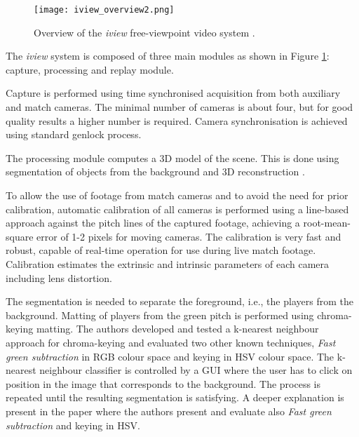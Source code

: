 
\begin{figure}[htbp]
\centerline{\texttt{[image: iview\_overview2.png]}}
\caption{Overview of the \textit{iview} free-viewpoint video system \cite{02_iview}.}
\label{fig:iview_overview}
\end{figure}


The \textit{iview} system is composed of three main modules as shown in Figure \ref{fig:iview_overview}: 
capture, processing and replay module.

Capture is performed using time synchronised acquisition from both auxiliary and
match cameras.
The minimal number of cameras is about four, but for good quality results a higher number is required.
Camera synchronisation is achieved using standard genlock process.

The processing module computes a 3D model of the scene.
This is done using segmentation of objects from the background and 3D reconstruction \cite{2.1_iview}.

To allow the use of footage from match cameras and to avoid the need for prior calibration, 
automatic calibration of all cameras is performed using a line-based approach against the pitch lines of the captured footage, 
achieving a root-mean-square error of 1-2 pixels for moving cameras. 
The calibration is very fast and robust, capable of real-time operation for use during live match footage. 
Calibration estimates the extrinsic and intrinsic parameters of each camera including lens distortion.

The segmentation is needed to separate the foreground, i.e., the players from the background.
Matting of players from the green pitch is performed using chroma-keying matting. 
The authors developed and tested a k-nearest neighbour approach for chroma-keying and evaluated two other known techniques,
\textit{Fast green subtraction} in RGB colour space and keying in HSV colour space.
The k-nearest neighbour classifier is controlled by a GUI where the user has to click on position in the image that corresponds
to the background. 
The process is repeated until the resulting segmentation is satisfying.
A deeper explanation is present in the paper \cite{2.1_iview} where the authors present and evaluate also 
\textit{Fast green subtraction} and keying in HSV.


